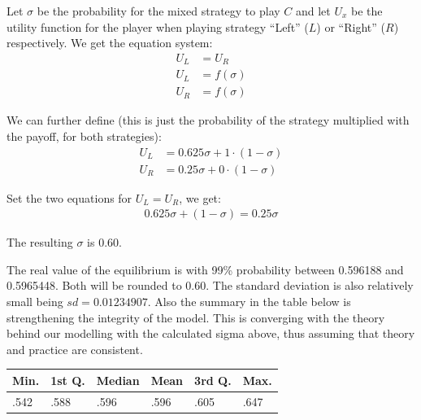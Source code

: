 \documentclass[DIV=calc, paper=a4, fontsize=11pt, twocolumn]{scrartcl}	 %
\begin{document}
Let $\sigma$ be the probability for the mixed strategy
to play $C$ and let $U_x$ be the utility function for the
player when playing strategy ``Left'' ($L$) or ``Right'' ($R$)
respectively. We get the equation system:
\begin{align*}
  U_L &= U_R\\
  U_L &= f(\sigma)\\
  U_R &= f(\sigma)
\end{align*}

We can further define (this is just the probability
of the strategy multiplied with the payoff, for both
strategies):
\begin{align*}
  U_L &= 0.625\sigma + 1 \cdot (1-\sigma)\\
  U_R &= 0.25\sigma + 0 \cdot (1-\sigma)
\end{align*}

Set the two equations for $U_L = U_R$, we get:
\begin{align*}
0.625\sigma + (1-\sigma) =  0.25\sigma
\end{align*}

The resulting $\sigma$ is $0.60$. 

The real value of the equilibrium is with 99\% probability between 0.596188 and 0.5965448. Both will be rounded to 0.60. The standard deviation is also relatively small being $sd = 0.01234907$. Also the summary in the table below is strengthening the integrity of the model. This is converging with the theory behind our modelling with the calculated sigma above, thus assuming that theory and practice are consistent. \\
 
\begin{minipage}{.42\linewidth}
\begin{tabular}{llllll}
  Min. & 1st Q. & Median  &  Mean& 3rd Q.  &  Max.  \\
\midrule
.542 & .588 & .596&  .596 & .605 & .647 \\
\end{tabular}
\end{minipage}
\end{document}
